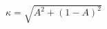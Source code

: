 \documentclass[border=1pt]{standalone}
\begin{document}
\fontsize{14}{16.8}\selectfont
\(\displaystyle \kappa = \sqrt{A^2 + (1-A)^2}\)
\end{document}
